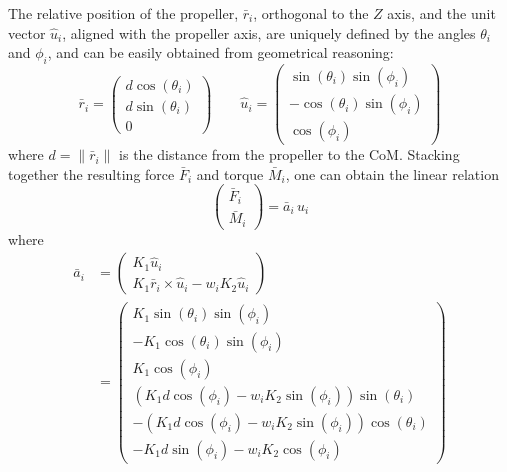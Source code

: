 The relative position of the propeller, $\bar{r}_i$, orthogonal to the
$Z$ axis, and the unit vector $\hat{u}_i$, aligned with the propeller
axis, are uniquely defined by the angles $\theta_i$ and $\phi_i$, and can be
easily obtained from geometrical reasoning:
\begin{equation}
  \bar{r}_i = \left(
    \begin{array}{c}
      d\cos(\theta_i) \\
      d\sin(\theta_i) \\
      0
      \end{array}
    \right)
    \qquad
    \hat{u}_i = \left(
      \begin{array}{c}
        \sin(\theta_i)\sin(\phi_i) \\
        -\cos(\theta_i)\sin(\phi_i) \\
        \cos(\phi_i)
      \end{array}
      \right)
\end{equation}
where $d=\|\bar{r}_i\|$ is the distance from the propeller to the CoM.
Stacking together the resulting force $\bar{F}_i$ and torque
$\bar{M}_i$, one can obtain the linear relation
\begin{equation}
  \label{eq:fm}
  \left(
    \begin{array}{c}
      \bar{F}_i \\
      \bar{M}_i
    \end{array}
  \right) = \bar{a}_i\,u_i
\end{equation}
where
\begin{equation}
  \begin{split}
    \bar{a}_i  &= \left(
      \begin{array}{c}
        K_1 \hat{u}_i \\
        K_1 \bar{r}_i \times \hat{u}_i - w_i K_2 \hat{u}_i
      \end{array}
    \right) \\
    &= \left(
      \begin{array}{c}
        K_1 \sin(\theta_i)\sin(\phi_i) \\
        -K_1 \cos(\theta_i)\sin(\phi_i) \\
        K_1 \cos(\phi_i) \\
        (K_1 d \cos(\phi_i) - w_i K_2 \sin(\phi_i))\sin(\theta_i) \\
        -(K_1 d \cos(\phi_i) - w_i K_2 \sin(\phi_i))\cos(\theta_i) \\
        -K_1 d \sin(\phi_i) - w_i K_2 \cos(\phi_i)
      \end{array}
    \right)
    \end{split}
\end{equation}

